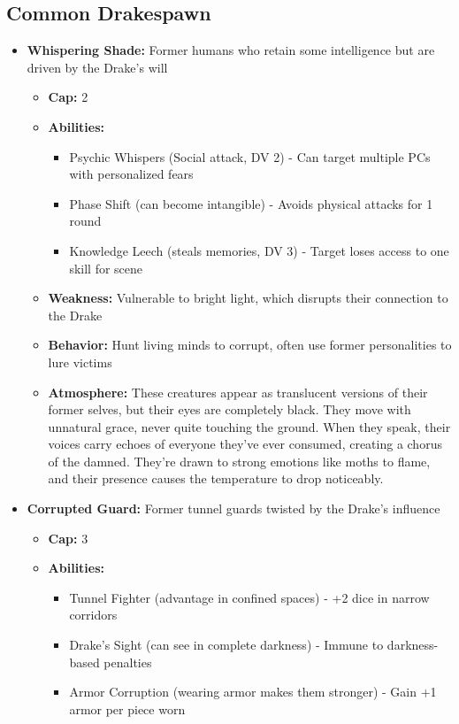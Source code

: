 \documentclass[11pt]{article}
\begin{document}
\subsection{Common Drakespawn}
\begin{itemize}
\item \textbf{Whispering Shade:} Former humans who retain some intelligence but are driven by the Drake's will
  \begin{itemize}
  \item \textbf{Cap:} 2
  \item \textbf{Abilities:}
    \begin{itemize}
    \item Psychic Whispers (Social attack, DV 2) - Can target multiple PCs with personalized fears
    \item Phase Shift (can become intangible) - Avoids physical attacks for 1 round
    \item Knowledge Leech (steals memories, DV 3) - Target loses access to one skill for scene
    \end{itemize}
  \item \textbf{Weakness:} Vulnerable to bright light, which disrupts their connection to the Drake
  \item \textbf{Behavior:} Hunt living minds to corrupt, often use former personalities to lure victims
  \item \textbf{Atmosphere:} These creatures appear as translucent versions of their former selves, but their eyes are completely black. They move with unnatural grace, never quite touching the ground. When they speak, their voices carry echoes of everyone they've ever consumed, creating a chorus of the damned. They're drawn to strong emotions like moths to flame, and their presence causes the temperature to drop noticeably.
  \end{itemize}
\item \textbf{Corrupted Guard:} Former tunnel guards twisted by the Drake's influence
  \begin{itemize}
  \item \textbf{Cap:} 3
  \item \textbf{Abilities:}
    \begin{itemize}
    \item Tunnel Fighter (advantage in confined spaces) - +2 dice in narrow corridors
    \item Drake's Sight (can see in complete darkness) - Immune to darkness-based penalties
    \item Armor Corruption (wearing armor makes them stronger) - Gain +1 armor per piece worn

\end{itemize}
\end{itemize}
\end{itemize}
\end{document}

